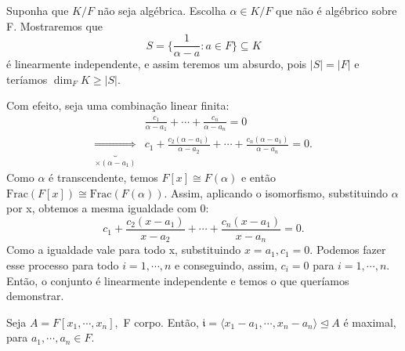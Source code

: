 \documentclass[AlgebraII/algebraII_notes.tex]{subfiles}
\begin{document}
\begin{proof*}
	Suponha que \(K/F\) não seja algébrica. Escolha \(\alpha \in K/F\) que não é
	algébrico sobre F. Mostraremos que
	\[
		S = \biggl\{\frac{1}{\alpha - a}: a\in F\biggr\}\subseteq{K}
	\]
	é linearmente independente, e assim teremos um absurdo, pois \(|S| = |F|\) e teríamos
	\(\dim_{F}K\geq |S|.\)

	Com efeito, seja uma combinação linear finita:
	\begin{align*}
		                                                  & \frac{c_{1}}{\alpha - a_{1}} + \cdots + \frac{c_{n}}{\alpha - a_{n}} = 0                                          \\
		\underbrace{\Rightarrow}_{\times (\alpha -a_{1})} & c_{1} + \frac{c_{2}(\alpha - a_{1})}{\alpha - a_{2}} + \cdots + \frac{c_{n}(\alpha - a_{1})}{\alpha - a_{n}} = 0.
	\end{align*}
	Como \(\alpha \) é transcendente, temos \(F[x]\cong{F(\alpha )}\) e então \(\mathrm{Frac}(F[x])\cong{\mathrm{Frac}(F(\alpha ))}\).
	Assim, aplicando o isomorfismo, substituindo \(\alpha \) por x, obtemos a mesma igualdade com 0:
	\[
		c_{1} + \frac{c_{2}(x-a_{1})}{x-a_{2}} + \cdots + \frac{c_{n}(x-a_{1})}{x-a_{n}} = 0.
	\]
	Como a igualdade vale para todo x, substituindo \(x=a_{1}, c_{1} = 0.\) Podemos fazer esse processo para
	todo \(i=1, \cdots, n\) e conseguindo, assim, \(c_{i} = 0\) para \(i=1, \cdots, n.\) Então, o conjunto é linearmente independente
	e temos o que queríamos demonstrar. \qedsymbol
\end{proof*}
\begin{theorem*}
	Seja \(A = F[x_{1}, \cdots, x_{n}],\) F corpo. Então, \(\mathfrak{i} = \langle x_{1}-a_{1}, \cdots, x_{n}-a_{n}\rangle \trianglelefteq{A}\)
	é maximal, para \(a_{1}, \cdots, a_{n}\in F\).
\end{theorem*}
\end{document}
